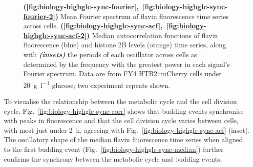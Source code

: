 \begin{figure}[b!]
  \caption[
    Mean Fourier spectrum of flavin fluorescence time series across cells.
    Median autocorrelation functions of flavin fluorescence and histone 2B levels time series, along with the periods of each oscillator across cells.
    Data are from FY4 HTB2::mCherry cells under \SI{20}{\gram~\litre^{-1}} glucose.
  ]{
    \textbf{(\ref{fig:biology-highglc-sync-fourier},~\ref{fig:biology-highglc-sync-fourier-2})} Mean Fourier spectrum of flavin fluorescence time series across cells. \textbf{(\ref{fig:biology-highglc-sync-acf},~\ref{fig:biology-highglc-sync-acf-2})} Median autocorrelation functions of flavin fluorescence (blue) and histone 2B levels (orange) time series, along with \textit{\textbf{(insets)}} the periods of each oscillator across cells as determined by the frequency with the greatest power in each signal's Fourier spectrum.
    Data are from FY4 HTB2::mCherry cells under \SI{20}{\gram~\litre^{-1}} glucose; two experiment repeats shown.
  }
  \label{fig:biology-highglc-sync-spectral}
\end{figure}

To visualise the relationship between the metabolic cycle and the cell division cycle,
Fig.\ \ref{fig:biology-highglc-sync-corr} shows that
budding events synchronise with peaks in fluorescence and
that the cell division cycle varies between cells,
with most just under \SI{2}{\hour}, agreeing with Fig.\ \ref{fig:biology-highglc-sync-acf} (inset).
The oscillatory shape of the median flavin fluorescence time series when aligned to the first budding event (Fig.\ \ref{fig:biology-highglc-sync-median}) further confirms the synchrony between the metabolic cycle and budding events.

